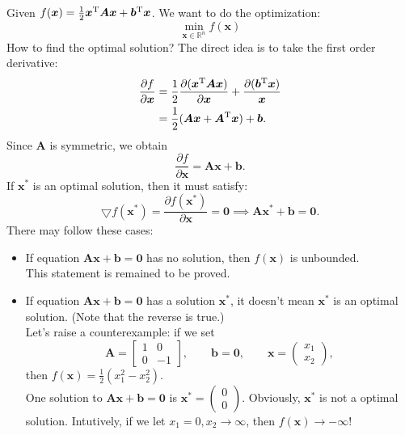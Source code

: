 \begin{example}\qquad\\
Given $f(\bm x)=\frac{1}{2}\bm x^{\mathrm T}\bm A\bm x+\bm b^{\mathrm T}\bm x$. We want to do the optimization:
\[
\min_{\bm x\in\mathbb{R}^{n}}f(\bm x)
\]
How to find the optimal solution? The direct idea is to take the first order derivative:
\begin{align*}
\frac{\partial f}{\partial \bm x}&=\frac{1}{2}\frac{\partial(\bm x^{\mathrm T}\bm A\bm x)}{\partial \bm x}+\frac{\partial(\bm b^{\mathrm T}\bm x)}{\bm x}\\
&=\frac{1}{2}(\bm{Ax}+\bm A^{\mathrm T}\bm x)+\bm b.
\end{align*}
Since $\bm A$ is symmetric, we obtain
\[
\frac{\partial f}{\partial \bm x}=\bm{Ax}+\bm b.
\]
If $\bm x^{*}$ is an optimal solution, then it must satisfy:
\[
\bigtriangledown f(\bm x^{*})=\frac{\partial f(\bm x^{*})}{\partial \bm x}=\bm 0\implies
\bm A\bm x^{*}+\bm b=\bm 0.
\]
There may follow these cases:
\begin{itemize}
\item
If equation $\bm{Ax}+\bm b=\bm 0$ has no solution, then $f(\bm x)$ is unbounded.\\
This statement is remained to be proved.
\item
If equation $\bm{Ax}+\bm b=\bm 0$ has a solution $\bm x^{*}$, it doesn't mean $\bm x^{*}$ is an optimal solution. (Note that the reverse is true.)\\
Let's raise a counterexample: if we set
\[
\bm A=\begin{bmatrix}
1&0\\0&-1
\end{bmatrix},\qquad\bm b=\bm 0,\qquad\bm x=\begin{pmatrix}
x_1\\x_2
\end{pmatrix},
\]
then $f(\bm x)=\frac{1}{2}(x_1^2-x_2^2)$.\\
One solution to $\bm{Ax}+\bm b=\bm 0$ is $\bm x^*=\begin{pmatrix}
0\\0
\end{pmatrix}$. Obviously, $\bm x^{*}$ is not a optimal solution. Intutively, if we let $x_1=0,x_2\rightarrow\infty$, then $f(\bm x)\rightarrow-\infty$!
\end{itemize}
\end{example}
